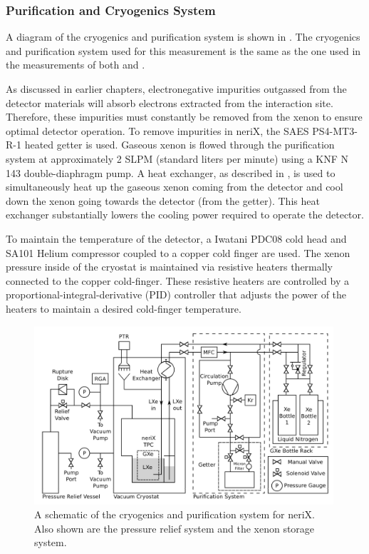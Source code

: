\subsubsection{Purification and Cryogenics System}
\label{sec:nerix_cryo_pur}

A diagram of the cryogenics and purification system is shown in .  The cryogenics and purification system used for this measurement is the same as the one used in the measurements of both  and .

As discussed in earlier chapters, electronegative impurities outgassed from the detector materials will absorb electrons extracted from the interaction site.  Therefore, these impurities must constantly be removed from the xenon to ensure optimal detector operation.  To remove impurities in neriX, the SAES PS4-MT3-R-1 heated getter is used.  Gaseous xenon is flowed through the purification system at approximately 2 SLPM (standard liters per minute) using a KNF N 143 double-diaphragm pump.  A heat exchanger, as described in , is used to simultaneously heat up the gaseous xenon coming from the detector and cool down the xenon going towards the detector (from the getter).  This heat exchanger substantially lowers the cooling power required to operate the detector.

To maintain the temperature of the detector, a Iwatani PDC08 cold head and SA101 Helium compressor coupled to a copper cold finger are used.  The xenon pressure inside of the cryostat is maintained via resistive heaters thermally connected to the copper cold-finger.  These resistive heaters are controlled by a proportional-integral-derivative (PID) controller that adjusts the power of the heaters to maintain a desired cold-finger temperature.


\begin{figure}[t]
        \centering
	\includegraphics[width=0.99\textwidth]{nerix_cryo_pur}
	\caption{A schematic of the cryogenics and purification system for neriX.  Also shown are the pressure relief system and the xenon storage system.}
	\label{fig:nerix_cryo_pur}
\end{figure}



